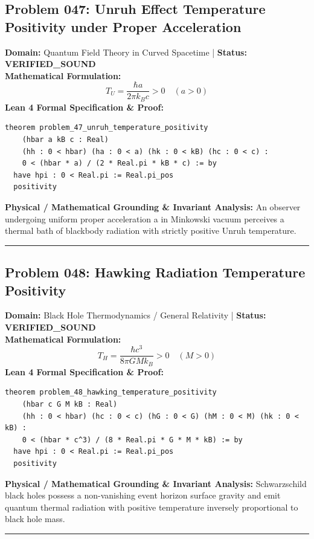 \documentclass[10pt,a4paper]{article}
\begin{document}
\subsection*{Problem 047: Unruh Effect Temperature Positivity under Proper Acceleration}
\textbf{Domain:} Quantum Field Theory in Curved Spacetime \quad | \quad \textbf{Status:} \textcolor{green!70!black}{\textbf{VERIFIED\_SOUND}}\\
\textbf{Mathematical Formulation:}
\begin{equation*}
  T_U = \frac{\hbar a}{2\pi k_B c} > 0 \quad (a > 0)
\end{equation*}
\textbf{Lean 4 Formal Specification \& Proof:}
\begin{lstlisting}
theorem problem_47_unruh_temperature_positivity
    (hbar a kB c : Real)
    (hh : 0 < hbar) (ha : 0 < a) (hk : 0 < kB) (hc : 0 < c) :
    0 < (hbar * a) / (2 * Real.pi * kB * c) := by
  have hpi : 0 < Real.pi := Real.pi_pos
  positivity
\end{lstlisting}
\textbf{Physical / Mathematical Grounding \& Invariant Analysis:}
An observer undergoing uniform proper acceleration a in Minkowski vacuum perceives a thermal bath of blackbody radiation with strictly positive Unruh temperature.
\vspace{0.8em}\hrule\vspace{0.8em}
\subsection*{Problem 048: Hawking Radiation Temperature Positivity}
\textbf{Domain:} Black Hole Thermodynamics / General Relativity \quad | \quad \textbf{Status:} \textcolor{green!70!black}{\textbf{VERIFIED\_SOUND}}\\
\textbf{Mathematical Formulation:}
\begin{equation*}
  T_H = \frac{\hbar c^3}{8\pi G M k_B} > 0 \quad (M > 0)
\end{equation*}
\textbf{Lean 4 Formal Specification \& Proof:}
\begin{lstlisting}
theorem problem_48_hawking_temperature_positivity
    (hbar c G M kB : Real)
    (hh : 0 < hbar) (hc : 0 < c) (hG : 0 < G) (hM : 0 < M) (hk : 0 < kB) :
    0 < (hbar * c^3) / (8 * Real.pi * G * M * kB) := by
  have hpi : 0 < Real.pi := Real.pi_pos
  positivity
\end{lstlisting}
\textbf{Physical / Mathematical Grounding \& Invariant Analysis:}
Schwarzschild black holes possess a non-vanishing event horizon surface gravity and emit quantum thermal radiation with positive temperature inversely proportional to black hole mass.
\vspace{0.8em}\hrule\vspace{0.8em}
\end{document}
